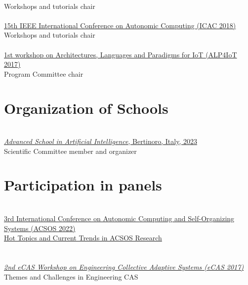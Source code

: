 \\ Workshops and tutorials chair \\
\halfblankline \\
\href{http://icac2018.informatik.uni-wuerzburg.de/committees/organization-committee/}{15th IEEE International Conference on Autonomic Computing (ICAC 2018)}
\\ Workshops and tutorials chair \\
\halfblankline \\
\href{http://apice.unibo.it/xwiki/bin/view/ALP4IoT2016/WebHome}{1st workshop on Architectures, Languages and Paradigms for IoT (ALP4IoT 2017)}
\\ Program Committee chair \\

\section{{\color{black}Organization of Schools}}
\halfblankline \\
\href{https://asai-er.github.io/}{\emph{Advanced School in Artificial Intelligence}, Bertinoro, Italy, 2023}
\\ Scientific Committee member and organizer \\

\section{{\color{black}Participation in panels}}
\halfblankline \\
\href{https://2022.acsos.org/details/acsos-2022-papers/36/Hot-Topics-and-Current-Trends-in-ACSOS-Research}
{3rd International Conference on Autonomic Computing and Self-Organizing Systems (ACSOS 2022)}
\\ \href{https://danysk.github.io/Slides-2022-ACSOS-Panel/#/}{Hot Topics and Current Trends in ACSOS Research} \\
\\ \halfblankline \\
\href{http://apice.unibo.it/xwiki/bin/view/ECAS2017/WebHome}{\textit{2nd eCAS Workshop on Engineering Collective Adaptive Systems (eCAS 2017)}}
\\ Themes and Challenges in Engineering CAS \\

